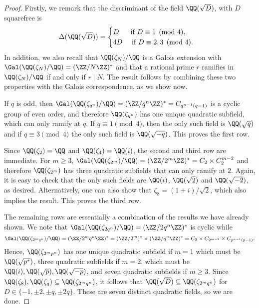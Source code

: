 \begin{proof}
    Firstly, we remark that the discriminant of the field $\QQ(\sqrt{D})$, with $D$ squarefree is
    \begin{equation}
        \Delta(\QQ(\sqrt{D}))=
        \begin{cases}
            D \ \quad\text{  if } D\equiv1\pmod{4},\\
            4D \quad\text{ if } D\equiv2,3\pmod{4}.
        \end{cases}
    \end{equation}
    In addition, we also recall that $\QQ(\zeta_N)/\QQ$ is a Galois extension with $\Gal(\QQ(\zeta_N)/\QQ)=(\ZZ/N\ZZ)^*$ and that a rational prime $r$ ramifies in $\QQ(\zeta_N)/\QQ$ if and only if $r\mid N$. The result follows by combining these two properties with the Galois correspondence, as we show now.

    If $q$ is odd, then $\Gal(\QQ(\zeta_{q^n})/\QQ)=(\ZZ/q^n\ZZ)^*=C_{q^{n-1}(q-1)}$ is a cyclic group of even order, and therefore $\QQ(\zeta_{q^n})$ has one unique quadratic subfield, which can only ramify at $q$. If $q\equiv1\pmod{4}$, then the only such field is $\QQ(\sqrt{q})$ and if $q\equiv3\pmod{4}$ the only such field is $\QQ(\sqrt{-q})$. This proves the first row. 

    Since $\QQ(\zeta_2)=\QQ$ and $\QQ(\zeta_4)=\QQ(i)$, the second and third row are immediate. For $m\geq3$, $\Gal(\QQ(\zeta_{2^m})/\QQ)=(\ZZ/2^m\ZZ)^*=C_2\times C_2^{m-2}$ and therefore $\QQ(\zeta_{2^m})$ has three quadratic subfields that can only ramify at $2$. Again, it is easy to check that the only such fields are $\QQ(i)$, $\QQ(\sqrt{2})$ and $\QQ(\sqrt{-2})$, as desired. Alternatively, one can also show that $\zeta_8=(1+i)/\sqrt{2}$, which also implies the result. This proves the third row.

    The remaining rows are essentially a combination of the results we have already shown. We note that $\Gal(\QQ(\zeta_{2q^n})/\QQ)=(\ZZ/2q^n\ZZ)^*$ is cyclic while 
    $$\Gal(\QQ(\zeta_{2^mq^n})/\QQ)=(\ZZ/2^mq^n\ZZ)^*=(\ZZ/2^m)^*\times(\ZZ/q^n\ZZ)^*=C_2\times C_{2^{m-2}}\times C_{p^{n-1}(p-1)}.$$
    Hence, $\QQ(\zeta_{2^mp^n})$ has one unique quadratic subfield if $m=1$ which must be $\QQ(\sqrt{p^*})$, three quadratic subfields if $m=2$, which must be $\QQ(i),\QQ(\sqrt{p}),\QQ(\sqrt{-p})$, and seven quadratic subfields if $m\geq 3$. Since $\QQ(\zeta_8),\QQ(\zeta_q)\subseteq\QQ(\zeta_{2^mq^n})$, it follows that $\QQ(\sqrt{D})\subseteq\QQ(\zeta_{2^mq^n})$ for $D\in\{-1,\pm2,\pm q,\pm 2q\}$. These are seven distinct quadratic fields, so we are done.
\end{proof}

